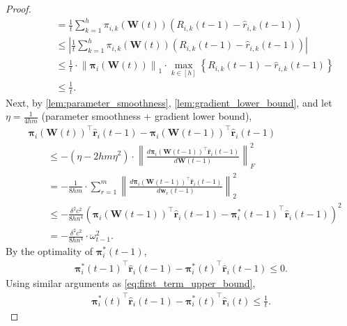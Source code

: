 \documentclass[10pt]{article}
\def\rvr{{\mathbf{r}}}
\def\rvw{{\mathbf{w}}}
\def\rvpi{{\boldsymbol{\pi}}}
\def\rmW{{\mathbf{W}}}
\begin{document}
\begin{proof}
\begin{equation}
\begin{split}
    &\qquad = \frac{1}{t} \sum\limits_{k=1}^{h}{ \pi_{i,k}\left(\rmW(t)\right) \left( R_{i,k}(t-1) - \hat{r}_{i,k}(t-1) \right)} \\
    &\qquad \le \left| \frac{1}{t} \sum\limits_{k=1}^{h}{ \pi_{i,k}\left(\rmW(t)\right) \left( R_{i,k}(t-1) - \hat{r}_{i,k}(t-1) \right)} \right| \\
    &\qquad \le \frac{1}{t} \cdot \left\| \rvpi_{i}\left(\rmW(t)\right) \right\|_1 \cdot \max\limits_{k \in [h]}{\left\{ R_{i,k}(t-1) - \hat{r}_{i,k}(t-1) \right\}} \\
    &\qquad \le \frac{1}{t}.
\end{split}
\end{equation}
Next, by \cref{lem:parameter_smoothness}, \cref{lem:gradient_lower_bound}, and let $\eta = \frac{1}{4 h m}$ (parameter smoothness + gradient lower bound),
\begin{equation}
\label{eq:second_term_upper_bound}
\begin{split}
    &\rvpi_i\left(\rmW(t)\right)^\top \hat{\rvr}_i(t-1) - \rvpi_i\left(\rmW(t-1)\right)^\top \hat{\rvr}_i(t-1) \\
    &\qquad \le - \left( \eta - 2 h m \eta^2 \right) \cdot \left\| \frac{d \rvpi_i\left(\rmW(t-1)\right)^\top \hat{\rvr}_i(t-1) }{d \rmW(t-1)} \right\|_F^2 \\
    &\qquad = - \frac{1}{8 h m} \cdot \sum\limits_{r=1}^{m}{ \left\| \frac{d \rvpi_i\left(\rmW(t-1)\right)^\top \hat{\rvr}_i(t-1) }{d \rvw_r(t-1)} \right\|_2^2 } \\
    &\qquad \le - \frac{\delta^2 c^2}{8 h n^4} \left( \rvpi_i\left(\rmW(t-1)\right)^\top \hat{\rvr}_i(t-1) - {\rvpi_i^*(t-1)}^\top \hat{\rvr}_i(t-1) \right)^2 \\
    &\qquad = - \frac{\delta^2 c^2}{8 h n^4} \cdot \omega_{t-1}^2.
\end{split}    
\end{equation}
By the optimality of ${\rvpi_i^*(t-1)}$,
\begin{equation}
\label{eq:fourth_term_upper_bound}
\begin{split}
    {\rvpi_i^*(t-1)}^\top \hat{\rvr}_i(t-1) - {\rvpi_i^*(t)}^\top \hat{\rvr}_i(t-1) \le 0.
\end{split}
\end{equation}
Using similar arguments as \cref{eq:first_term_upper_bound},
\begin{equation}
\label{eq:fifth_term_upper_bound}
\begin{split}
    {\rvpi_i^*(t)}^\top \hat{\rvr}_i(t-1) - {\rvpi_i^*(t)}^\top \hat{\rvr}_i(t) \le \frac{1}{t}.

\end{split}
\end{equation}
\end{proof}
\end{document}
